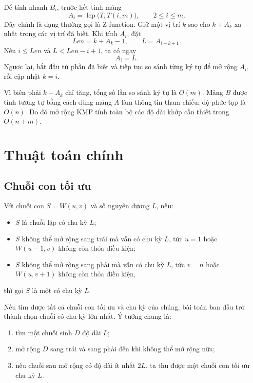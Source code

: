 \documentclass[11pt]{article}
\begin{document}
Để tính nhanh \(B_i\), trước hết tính mảng
\[
  A_i=\operatorname{lcp}\bigl(T,T(i,m)\bigr),\qquad 2\le i\le m.
\]
Đây chính là dạng thường gọi là Z-function. Giữ một vị trí \(k\) sao cho
\(k+A_k\) xa nhất trong các vị trí đã biết. Khi tính \(A_i\), đặt
\[
  \mathit{Len}=k+A_k-1,\qquad L=A_{i-k+1}.
\]
Nếu \(i\le \mathit{Len}\) và \(L<\mathit{Len}-i+1\), ta có ngay
\[
  A_i=L.
\]
Ngược lại, bắt đầu từ phần đã biết và tiếp tục so sánh từng ký tự để mở rộng
\(A_i\), rồi cập nhật \(k=i\).

Vì biên phải \(k+A_k\) chỉ tăng, tổng số lần so sánh ký tự là \(O(m)\). Mảng
\(B\) được tính tương tự bằng cách dùng mảng \(A\) làm thông tin tham chiếu;
độ phức tạp là \(O(n)\). Do đó mở rộng KMP tính toàn bộ các độ dài khớp cần
thiết trong \(O(n+m)\).

\section{Thuật toán chính}

\subsection{Chuỗi con tối ưu}

Với chuỗi con \(S=W(u,v)\) và số nguyên dương \(L\), nếu:

\begin{itemize}
  \item \(S\) là chuỗi lặp có chu kỳ \(L\);
  \item \(S\) không thể mở rộng sang trái mà vẫn có chu kỳ \(L\), tức
  \(u=1\) hoặc \(W(u-1,v)\) không còn thỏa điều kiện;
  \item \(S\) không thể mở rộng sang phải mà vẫn có chu kỳ \(L\), tức
  \(v=n\) hoặc \(W(u,v+1)\) không còn thỏa điều kiện,
\end{itemize}

thì gọi \(S\) là một  có chu kỳ \(L\).

Nếu tìm được tất cả chuỗi con tối ưu và chu kỳ của chúng, bài toán ban đầu
trở thành chọn chuỗi có chu kỳ lớn nhất. Ý tưởng chung là:

\begin{enumerate}
  \item tìm một chuỗi sinh \(D\) độ dài \(L\);
  \item mở rộng \(D\) sang trái và sang phải đến khi không thể mở rộng nữa;
  \item nếu chuỗi sau mở rộng có độ dài ít nhất \(2L\), ta thu được một chuỗi
  con tối ưu chu kỳ \(L\).
\end{enumerate}
\end{document}
